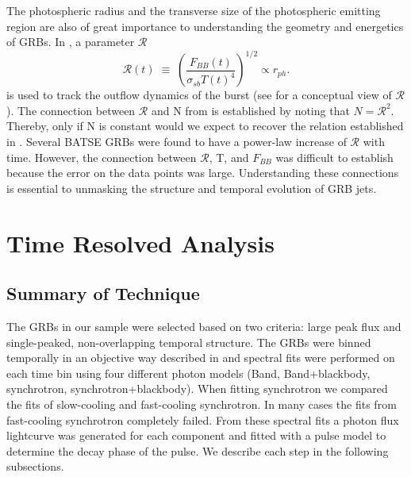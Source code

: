The photospheric radius and the transverse size of the photospheric
emitting region are also of great importance to understanding the geometry
and energetics of GRBs. In \cite{Ryde:2009}, a parameter
$\mathcal{R}$ 
\begin{equation}
  \label{eq:scR}
  \mathcal{R}(t)\;\equiv\;\left(\frac{F_{BB}(t)}{\sigma_{sb}T(t)^4} \right)^{1/2} \propto r_{ph}.
\end{equation}
is used to track the outflow dynamics of the burst (see  for a conceptual view of $\mathcal{R}$). The connection
between $\mathcal{R}$ and N from  is established
by noting that $N = \mathcal{R}^2$. Thereby, only if N is constant
would we expect to recover the relation established in
.  Several BATSE GRBs were found to have a
power-law increase of $\mathcal{R}$ with time. However, the connection
between $\mathcal{R}$, T, and $F_{BB}$ was difficult to establish
because the error on the data points was large. Understanding these
connections is essential to unmasking the structure and temporal
evolution of GRB jets.

\section{Time Resolved Analysis}

\label{sec:observe}

\subsection{Summary of Technique}
The GRBs in our sample were selected based on two criteria: large peak
flux and single-peaked, non-overlapping temporal structure. The GRBs
were binned temporally in an objective way described in
 and spectral fits were performed on each time
bin using four different photon models (Band, Band+blackbody,
synchrotron, synchrotron+blackbody). When fitting synchrotron we
compared the fits of slow-cooling and fast-cooling synchrotron. In
many cases the fits from fast-cooling synchrotron completely
failed. From these spectral fits a photon flux lightcurve was
generated for each component and fitted with a pulse model to
determine the decay phase of the pulse. We describe each step in the
following subsections.

